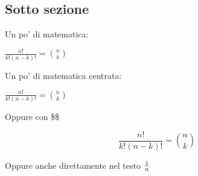 \documentclass[twoside]{supsistudent}
\begin{document}
\lipsum[23]

\subsection{Sotto sezione}

Un po' di matematica: \newline

\begin{math}
\frac{n!}{k!(n-k)!} = {n \choose k}
\end{math} \newline

Un po' di matematica centrata:

\begin{center}
\begin{math}
\frac{n!}{k!(n-k)!} = {n \choose k}
\end{math}
\end{center}

Oppure con \$\$

$$
\frac{n!}{k!(n-k)!} = {n \choose k}
$$

Oppure anche direttamente nel testo ${1}\over{n}$ \\

\lipsum[23]



\end{document}
